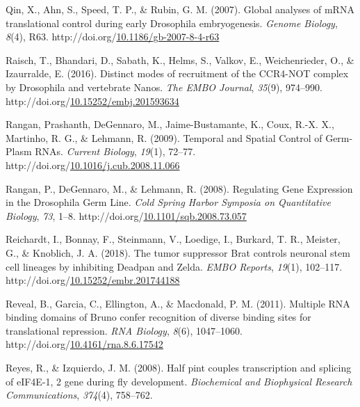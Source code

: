 \documentclass[12pt,oneside]{reedthesis}
\newlength{\cslhangindent}
\newenvironment{CSLReferences}[2] %
 {%
  \setlength{\parindent}{0pt}
  \ifodd #1 \everypar{\setlength{\hangindent}{\cslhangindent}}\ignorespaces\fi
  \ifnum #2 > 0
  \setlength{\parskip}{#2\baselineskip}
  \fi
 }%
 {}
\begin{document}
\begin{CSLReferences}{1}{0}
\leavevmode{}%
Qin, X., Ahn, S., Speed, T. P., \& Rubin, G. M. (2007). Global analyses of {mRNA} translational control during early {Drosophila} embryogenesis. \emph{Genome Biology}, \emph{8}(4), R63. http://doi.org/\href{https://doi.org/10.1186/gb-2007-8-4-r63}{10.1186/gb-2007-8-4-r63}

\leavevmode{}%
Raisch, T., Bhandari, D., Sabath, K., Helms, S., Valkov, E., Weichenrieder, O., \& Izaurralde, E. (2016). Distinct modes of recruitment of the {CCR4-NOT} complex by {Drosophila} and vertebrate {Nanos}. \emph{The EMBO Journal}, \emph{35}(9), 974--990. http://doi.org/\href{https://doi.org/10.15252/embj.201593634}{10.15252/embj.201593634}

\leavevmode{}%
Rangan, Prashanth, DeGennaro, M., Jaime-Bustamante, K., Coux, R.-X. X., Martinho, R. G., \& Lehmann, R. (2009). Temporal and {Spatial Control} of {Germ-Plasm RNAs}. \emph{Current Biology}, \emph{19}(1), 72--77. http://doi.org/\href{https://doi.org/10.1016/j.cub.2008.11.066}{10.1016/j.cub.2008.11.066}

\leavevmode{}%
Rangan, P., DeGennaro, M., \& Lehmann, R. (2008). Regulating {Gene Expression} in the {Drosophila Germ Line}. \emph{Cold Spring Harbor Symposia on Quantitative Biology}, \emph{73}, 1--8. http://doi.org/\href{https://doi.org/10.1101/sqb.2008.73.057}{10.1101/sqb.2008.73.057}

\leavevmode{}%
Reichardt, I., Bonnay, F., Steinmann, V., Loedige, I., Burkard, T. R., Meister, G., \& Knoblich, J. A. (2018). The tumor suppressor {Brat} controls neuronal stem cell lineages by inhibiting {Deadpan} and {Zelda}. \emph{EMBO Reports}, \emph{19}(1), 102--117. http://doi.org/\href{https://doi.org/10.15252/embr.201744188}{10.15252/embr.201744188}

\leavevmode{}%
Reveal, B., Garcia, C., Ellington, A., \& Macdonald, P. M. (2011). Multiple {RNA} binding domains of {Bruno} confer recognition of diverse binding sites for translational repression. \emph{RNA Biology}, \emph{8}(6), 1047--1060. http://doi.org/\href{https://doi.org/10.4161/rna.8.6.17542}{10.4161/rna.8.6.17542}

\leavevmode{}%
Reyes, R., \& Izquierdo, J. M. (2008). Half pint couples transcription and splicing of {eIF4E-1}, 2 gene during fly development. \emph{Biochemical and Biophysical Research Communications}, \emph{374}(4), 758--762.


\end{CSLReferences}
\end{document}
